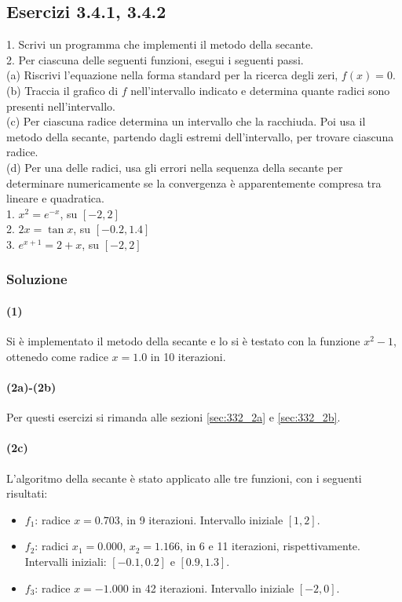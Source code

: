 \documentclass[letterpaper, 12pt]{article}
\begin{document}
\subsection{Esercizi 3.4.1, 3.4.2}
1. Scrivi un programma che implementi il metodo della secante. \\
2. Per ciascuna delle seguenti funzioni, esegui i seguenti passi. \\
(a) Riscrivi l'equazione nella forma standard per la ricerca degli zeri, $f(x) = 0$. \\
(b) Traccia il grafico di $f$ nell'intervallo indicato e determina quante radici sono presenti nell'intervallo. \\
(c) Per ciascuna radice determina un intervallo che la racchiuda. Poi usa il metodo della secante, 
    partendo dagli estremi dell'intervallo, per trovare ciascuna radice.\\
(d) Per una delle radici, usa gli errori nella sequenza della secante per determinare numericamente 
    se la convergenza è apparentemente compresa tra lineare e quadratica.\\
1. $x^2=e^{-x}$, su $[-2,2]$ \\
2. $2x = \tan x$, su $[-0.2,1.4]$ \\
3. $e^{x+1}=2+x$, su $[-2,2]$ \\

\subsubsection{Soluzione}
\paragraph{(1) } Si è implementato il metodo della secante e lo si è testato con la funzione $x^2 - 1$, 
ottenedo come radice $x = 1.0$ in 10 iterazioni. 

\paragraph{(2a)-(2b) } Per questi esercizi si rimanda alle sezioni \ref{sec:332_2a} e \ref{sec:332_2b}.

\paragraph{{(2c) } } L'algoritmo della secante è stato applicato alle tre funzioni, con i seguenti risultati:
\begin{itemize}
    \item $f_1$: radice $x = 0.703$, in 9 iterazioni. Intervallo iniziale $[1,2]$.
    \item $f_2$: radici $x_1 = 0.000$, $x_2 = 1.166$, in 6 e 11 iterazioni, rispettivamente. Intervalli iniziali:
    $[-0.1,0.2]$ e $[0.9,1.3]$.
    \item $f_3$: radice $x = -1.000$ in 42 iterazioni. Intervallo iniziale $[-2,0]$.
\end{itemize}
\end{document}
